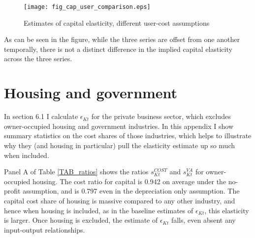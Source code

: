 \documentclass[11pt]{article}
\begin{document}
\begin{figure}[!htb]
\begin{center}
\caption{Estimates of capital elasticity, different user-cost assumptions}
\label{FIG_cap_user_inflation}
\texttt{[image: fig\_cap\_user\_comparison.eps]}
\end{center}
\vspace{-.5cm}
\end{figure}

As can be seen in the figure, while the three series are offset from one another temporally, there is not a distinct difference in the implied capital elasticity across the three series. 

\section{Housing and government}
In section 6.1 I calculate $\epsilon_{Kt}$ for the private business sector, which excludes owner-occupied housing and government industries. In this appendix I show summary statistics on the cost shares of those industries, which helps to illustrate why they (and housing in particular) pull the elasticity estimate up so much when included. 

Panel A of Table \ref{TAB_ratios} shows the ratios $s^{COST}_{Kt}$ and $s^{VA}_{Kt}$ for owner-occupied housing. The cost ratio for capital is 0.942 on average under the no-profit assumption, and is 0.797 even in the depreciation only assumption. The capital cost share of housing is massive compared to any other industry, and hence when housing is included, as in the baseline estimates of $\epsilon_{Kt}$, this elasticity is larger. Once housing is excluded, the estimate of $\epsilon_{Kt}$ falls, even absent any input-output relationships. 
\end{document}
